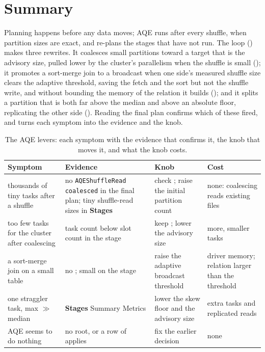 \section{Summary}
\label{sec:aqe-summary}

Planning happens before any data moves; AQE runs after every shuffle, when
partition sizes are exact, and re-plans the stages that have not run. The loop
() makes three rewrites. It coalesces small
partitions toward a target that is the advisory size, pulled lower by the
cluster's parallelism when the shuffle is small ();
it promotes a sort-merge join to a broadcast when one side's measured shuffle
size clears the adaptive threshold, saving the fetch and the sort but not the
shuffle write, and without bounding the memory of the relation it builds
(); and it splits a partition that is both far above
the median and above an absolute floor, replicating the other side
(). Reading the final plan confirms which of these fired,
and  turns each symptom into the evidence and the knob.

\begin{table}[htbp]
\centering\footnotesize
\renewcommand{\arraystretch}{1.25}
\begin{tabular}{@{}P{3.2cm}P{3.9cm}P{3.6cm}P{3.4cm}@{}}
\toprule
\textbf{Symptom} & \textbf{Evidence} & \textbf{Knob} & \textbf{Cost} \\
\midrule
thousands of tiny tasks after a shuffle & no \texttt{AQEShuffleRead coalesced} in the final plan; tiny shuffle-read sizes in \textbf{Stages} & check ; raise the initial partition count & none: coalescing reads existing files \\
too few tasks for the cluster after coalescing & task count below slot count in the stage & keep ; lower the advisory size & more, smaller tasks \\
a sort-merge join on a small table & no ; small  on the stage & raise the adaptive broadcast threshold & driver memory; relation larger than the threshold \\
one straggler task, max $\gg$ median & \textbf{Stages} Summary Metrics & lower the skew floor and the advisory size & extra tasks and replicated reads \\
AQE seems to do nothing & no  root, or a row of  applies & fix the earlier decision & none \\
\bottomrule
\end{tabular}
\caption{The AQE levers: each symptom with the evidence that confirms it, the knob
that moves it, and what the knob costs.}
\label{tab:aqe-levers}
\end{table}

